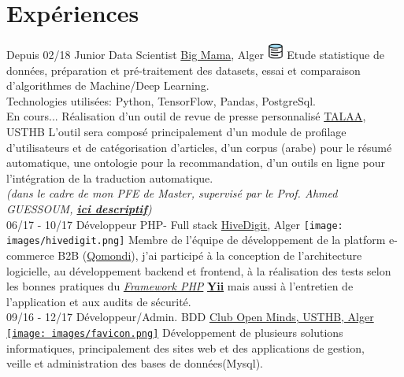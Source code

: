 \documentclass[]{friggeri-cv}
\begin{document}
\section{Expériences}
\begin{entrylist}
  \entry
    {Depuis 02/18}
    {Junior Data Scientist}
    {\href{http://big-mama.io/}{Big Mama}, Alger \includegraphics[width=15pt]{images/bigmama.png} }
    {Etude statistique de données, préparation et pré-traitement des datasets, essai et comparaison d'algorithmes de Machine/Deep Learning.\\
    Technologies utilisées: Python, TensorFlow, Pandas, PostgreSql.\\}
  \entry
    {En cours...}
    {Réalisation d'un outil de revue de presse personnalisé}
    {\href{http://lria.usthb.dz/TALAATeam/People.php}{TALAA}, USTHB }
    {L'outil sera composé principalement d'un module de profilage d'utilisateurs et de catégorisation d'articles, d'un corpus (arabe) pour le résumé automatique, une ontologie pour la recommandation, d'un outils en ligne pour l’intégration de la traduction automatique.\\\emph{(dans le cadre de mon PFE de Master, supervisé par le Prof. Ahmed GUESSOUM, \href{http://www.abafann.com/said_pfe.pdf}{\textbf{ici descriptif}})}\\}
  \entry
    {06/17 - 10/17}
    {Développeur PHP- Full stack}
    {\href{http://www.hivedigit.com/}{HiveDigit}, Alger \texttt{[image: images/hivedigit.png]} }
    {Membre de l'équipe de développement de la platform e-commerce B2B (\href{http://www.demo.b2b-dz.com/}{Qomondi}), j'ai participé à la conception de l'architecture logicielle, au développement backend et frontend, à la réalisation des tests selon les bonnes pratiques du \href{https://fr.wikipedia.org/wiki/Liste_de_frameworks_PHP}{\emph{Framework PHP}} \href{http://www.yiiframework.com/}{\textbf{Yii}} mais aussi à l'entretien de l'application et aux audits de sécurité.\\}
  \entry
    {09/16 - 12/17}
    {Développeur/Admin. BDD}
    {\href{http://www.openmindsclub.net/}{Club Open Minds, USTHB, Alger \texttt{[image: images/favicon.png]}}}
    {Développement de plusieurs solutions informatiques, principalement des sites web et des applications de gestion,\\veille et administration des bases de données(Mysql).\\}

\end{entrylist}
\end{document}
